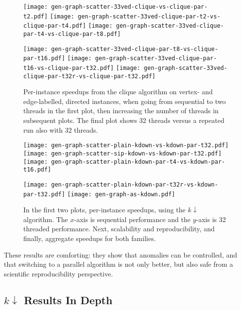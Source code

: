 \documentclass{llncs}
\begin{document}
\begin{figure}[p]
    \texttt{[image: gen-graph-scatter-33ved-clique-vs-clique-par-t2.pdf]}
    \hfill
    \texttt{[image: gen-graph-scatter-33ved-clique-par-t2-vs-clique-par-t4.pdf]}
    \hfill
    \texttt{[image: gen-graph-scatter-33ved-clique-par-t4-vs-clique-par-t8.pdf]}

    \vspace*{0.2em}

    \texttt{[image: gen-graph-scatter-33ved-clique-par-t8-vs-clique-par-t16.pdf]}
    \hfill
    \texttt{[image: gen-graph-scatter-33ved-clique-par-t16-vs-clique-par-t32.pdf]}
    \hfill
    \texttt{[image: gen-graph-scatter-33ved-clique-par-t32r-vs-clique-par-t32.pdf]}

    \caption{Per-instance speedups from the clique algorithm on vertex- and edge-labelled, directed
    instances, when going from sequential to two threads in the first plot, then increasing the
    number of threads in subsequent plots. The final plot shows 32 threads versus a repeated run
    also with 32 threads.}\label{figure:cliquescale}
\end{figure}

\begin{figure}[p]
    \texttt{[image: gen-graph-scatter-plain-kdown-vs-kdown-par-t32.pdf]}
    \hfill
    \texttt{[image: gen-graph-scatter-sip-kdown-vs-kdown-par-t32.pdf]}
    \hfill
    \texttt{[image: gen-graph-scatter-plain-kdown-par-t4-vs-kdown-par-t16.pdf]}

    \vspace*{0.2em}

    \texttt{[image: gen-graph-scatter-plain-kdown-par-t32r-vs-kdown-par-t32.pdf]}
    \hfill
    \texttt{[image: gen-graph-as-kdown.pdf]}

    \caption{In the first two plots, per-instance speedups, using the $k{\downarrow}$ algorithm. The
    $x$-axis is sequential performance and the $y$-axis is 32 threaded performance. Next,
    scalability and reproducibility, and finally, aggregate speedups for both
    families.}\label{figure:kdownscatters}
\end{figure}

These results are comforting: they show that anomalies can be controlled, and that
switching to a parallel algorithm is not only better, but also safe from a scientific
reproducibility perspective.

\subsection{$k{\downarrow}$ Results In Depth}
\end{document}
